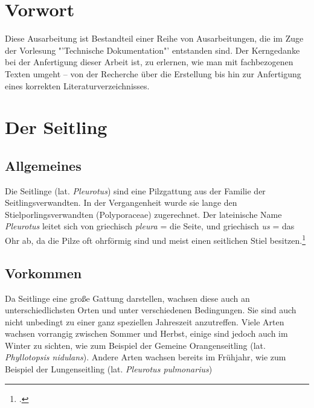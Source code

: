 \documentclass[a4paper,abstracton]{scrreprt}
\begin{document}


\tableofcontents
\pagebreak
\listoffigures

\begin{abstract}
\begin{quote}%
Unter dem Schirmthema \emph{Heimische Pilze} beschäftigt sich diese Ausarbeitung mit den Seitlingen (lat.: "'Pleurotus"'). Es werden unter anderem Kenntnisse über Allgemeinheiten, das Vorkommen, die Beschreibung des Pilzes sowie die bei Pilzen so wichtigen Verwechslungsmöglichkeiten vermittelt. Weiterhin wird eine Auswahl ausgesuchter Arten einzeln betrachtet.
\end{quote} 
\end{abstract}

\chapter{Vorwort}
Diese Ausarbeitung ist Bestandteil einer Reihe von Ausarbeitungen, die im Zuge der Vorlesung "'Technische Dokumentation"' entstanden sind. Der Kerngedanke bei der Anfertigung dieser Arbeit ist, zu erlernen, wie man mit fachbezogenen Texten umgeht -- von der Recherche über die Erstellung bis hin zur Anfertigung eines korrekten Literaturverzeichnisses. 

\chapter{Der Seitling}
\section{Allgemeines}
Die Seitlinge (lat. \emph{Pleurotus}) sind eine Pilzgattung aus der Familie der Seitlingsverwandten. In der Vergangenheit wurde sie lange den Stielporlingsverwandten (Polyporaceae) zugerechnet. Der lateinische Name \emph{Pleurotus} leitet sich von griechisch \emph{pleura} = die Seite, und griechisch \emph{us} = das Ohr ab, da die Pilze oft ohrförmig sind und meist einen seitlichen Stiel besitzen.\footcite{faktenuber} 

\section{Vorkommen}
Da Seitlinge eine große Gattung darstellen, wachsen diese auch an unterschiedlichsten Orten und unter verschiedenen Bedingungen. Sie sind auch nicht unbedingt zu einer ganz speziellen Jahreszeit anzutreffen. Viele Arten wachsen vorrangig zwischen Sommer und Herbst, einige sind jedoch auch im Winter zu sichten, wie zum Beispiel der Gemeine Orangenseitling (lat. \emph{Phyllotopsis nidulans}). Andere Arten wachsen bereits im Frühjahr, wie zum Beispiel der Lungenseitling (lat. \emph{Pleurotus pulmonarius})
\end{document}
